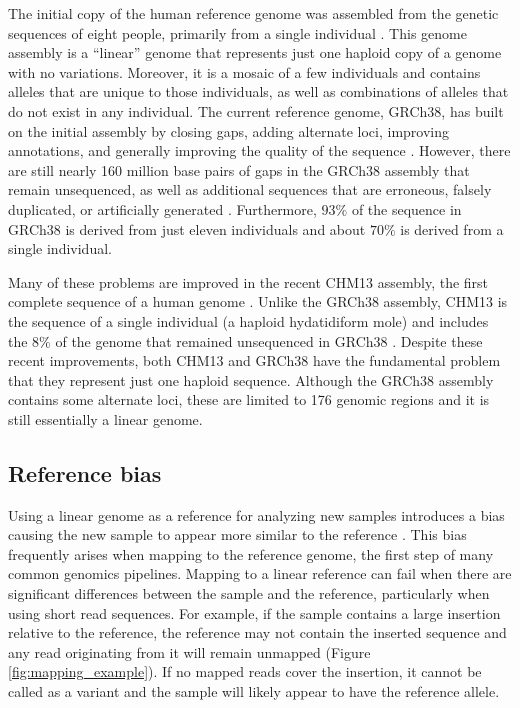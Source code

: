 \documentclass[11pt]{ucscthesis}
\begin{document}
The initial copy of the human reference genome was assembled from the genetic sequences of eight people, primarily from a single individual \cite{lander_initial_2001}.
This genome assembly is a ``linear'' genome that represents just one haploid copy of a genome with no variations.
Moreover, it is a mosaic of a few individuals and contains alleles that are unique to those individuals, as well as combinations of alleles that do not exist in any individual.
The current reference genome, GRCh38, has built on the initial assembly by closing gaps, adding alternate loci, improving annotations, and generally improving the quality of the sequence \cite{schneider_evaluation_2017}.
However, there are still nearly 160 million base pairs of gaps in the GRCh38 assembly that remain unsequenced, as well as additional sequences that are erroneous, falsely duplicated, or artificially generated \cite{schneider_evaluation_2017,nurk_complete_2022}.
Furthermore, $93\%$ of the sequence in GRCh38 is derived from just eleven individuals and about $70\%$ is derived from a single individual.

Many of these problems are improved in the recent CHM13 assembly, the first complete sequence of a human genome \cite{nurk_complete_2022}.
Unlike the GRCh38 assembly, CHM13 is the sequence of a single individual (a haploid hydatidiform mole) and includes the $8\%$ of the genome that remained unsequenced in GRCh38 \cite{nurk_complete_2022}.
Despite these recent improvements, both CHM13 and GRCh38 have the fundamental problem that they represent just one haploid sequence.
Although the GRCh38 assembly contains some alternate loci, these are limited to 176 genomic regions \cite{schneider_evaluation_2017} and it is still essentially a linear genome.

\subsection{Reference bias}

Using a linear genome as a reference for analyzing new samples introduces a bias causing the new sample to appear more similar to the reference \cite{ballouz_is_2019,noauthor_computational_2016,eizenga_pangenome_2020}.
This bias frequently arises when mapping to the reference genome, the first step of many common genomics pipelines.
Mapping to a linear reference can fail when there are significant differences between the sample and the reference, particularly when using short read sequences.
For example, if the sample contains a large insertion relative to the reference, the reference may not contain the inserted sequence and any read originating from it will remain unmapped (Figure \ref{fig:mapping_example}).
If no mapped reads cover the insertion, it cannot be called as a variant and the sample will likely appear to have the reference allele.
\end{document}
